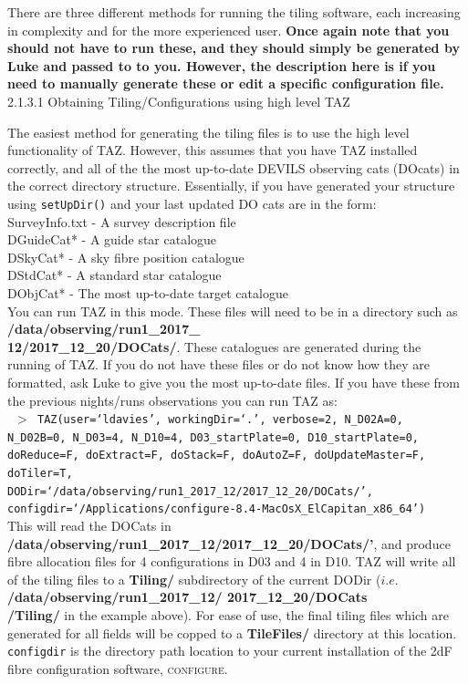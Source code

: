 \documentclass[12pt]{article}
\begin{document}
There are three different methods for running the tiling software, each increasing in complexity and for the more experienced user. \textbf{\textcolor{PineGreen}{Once again note that you should not have to run these, and they should simply be generated by Luke and passed to to you. However, the description here is if you need to manually generate these or edit a specific configuration file.}}\\

\textsf{2.1.3.1 Obtaining Tiling/Configurations using high level TAZ}
\vspace{2mm}

The easiest method for generating the tiling files is to use the high level functionality of TAZ. However, this assumes that you have TAZ installed correctly, and all of the the most up-to-date DEVILS observing cats (DOcats) in the correct directory structure. Essentially, if you have generated your structure using \texttt{setUpDir()} and your last updated DO cats are in the form: \\

SurveyInfo.txt - A survey description file \\
DGuideCat* - A guide star catalogue \\
DSkyCat* - A sky fibre position catalogue \\
DStdCat* - A standard star catalogue \\
DObjCat* - The most up-to-date target catalogue \\

You can run TAZ in this mode. These files will need to be in a directory such as \textbf{/data/observing/run1\_2017\_ \\ 12/2017\_12\_20/DOCats/}. These catalogues are generated during the running of TAZ. If you do not have these files or do not know how they are formatted, ask Luke to give you the most up-to-date files. If you have these from the previous nights/runs observations you can run TAZ as: \\

\texttt{ $>$ TAZ(user=`ldavies', workingDir=`.', verbose=2, N\_D02A=0, N\_D02B=0, N\_D03=4, N\_D10=4, D03\_startPlate=0, D10\_startPlate=0, doReduce=F, doExtract=F, 
doStack=F, doAutoZ=F, doUpdateMaster=F, doTiler=T, \\
DODir=`/data/observing/run1\_2017\_12/2017\_12\_20/DOCats/', configdir=`/Applications/configure-8.4-MacOsX\_ElCapitan\_x86\_64')} \\

This will read the DOCats in \textbf{/data/observing/run1\_2017\_12/2017\_12\_20/DOCats/'}, and produce fibre allocation files for 4 configurations in D03 and 4 in D10. TAZ will write all of the tiling files to a \textbf{Tiling/} subdirectory of the current DODir ($i.e.$ \textbf{/data/observing/run1\_2017\_12/ 2017\_12\_20/DOCats \\ /Tiling/} in the example above). For ease of use, the final tiling files which are generated for all fields will be copped to a  \textbf{TileFiles/} directory at this location. \texttt{configdir} is the directory path location to your current installation of the 2dF fibre configuration software, \textsc{configure}. \\
\end{document}
